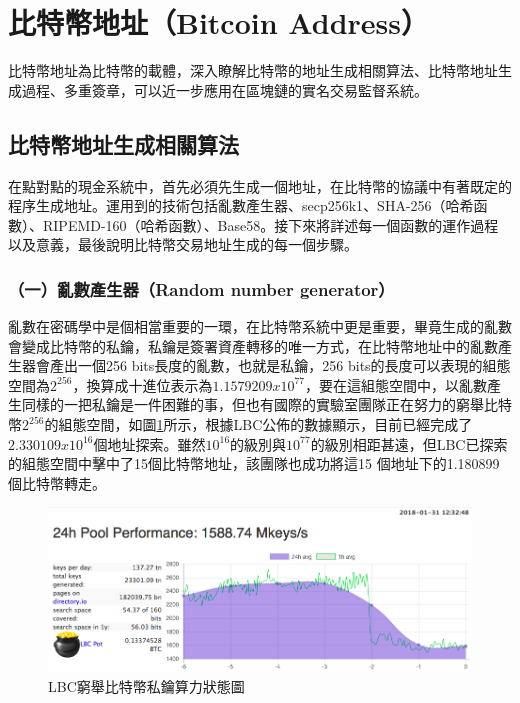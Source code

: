 		\section{比特幣地址（Bitcoin Address）}
		⽐特幣地址為⽐特幣的載體，深⼊瞭解⽐特幣的地址⽣成相關算法、⽐特幣地址⽣成過程、多重簽章，可以近⼀步應⽤在區塊鏈的實名交易監督系統。

			\subsection{比特幣地址生成相關算法}
			在點對點的現金系統中，首先必須先生成一個地址，在比特幣的協議中有著既定的程序生成地址。運用到的技術包括亂數產生器、secp256k1\supercite{johnson2001elliptic}、SHA-256（哈希函數）\supercite{DBLP:conf/fse/KhovratovichRS12}、RIPEMD-160（哈希函數）\supercite{DBLP:conf/isw/MendelPRR06}、Base58\supercite{Base58}。接下來將詳述每一個函數的運作過程以及意義，最後說明比特幣交易地址生成的每一個步驟。
			
				\subsubsection{（一）亂數產生器（Random number generator）}
				亂數在密碼學中是個相當重要的一環，在比特幣系統中更是重要，畢竟生成的亂數會變成比特幣的私鑰，私鑰是簽署資產轉移的唯一方式，在比特幣地址中的亂數產生器會產出一個256 bits長度的亂數，也就是私鑰，256 bits的長度可以表現的組態空間為$2^{256}$，換算成十進位表示為$1.1579209x10^{77}$，要在這組態空間中，以亂數產生同樣的一把私鑰是一件困難的事，但也有國際的實驗室\supercite{TheLargeBitcoinCollider}團隊正在努力的窮舉比特幣$2^{256}$的組態空間，如圖\ref{LBC}所示，根據LBC公佈的數據顯示，目前已經完成了$2.330109x10^{16}$個地址探索。雖然$10^{16}$的級別與$10^{77}$的級別相距甚遠，但LBC已探索的組態空間中擊中了15個比特幣地址，該團隊也成功將這15 個地址下的1.180899個比特幣轉走。

				\begin{figure}[htbp]
					\centering
					\includegraphics[width = .9\textwidth]{LBC.png}
					\caption{LBC窮舉比特幣私鑰算力狀態圖\supercite{TheLargeBitcoinCollider}}\label{LBC}
				\end{figure}

